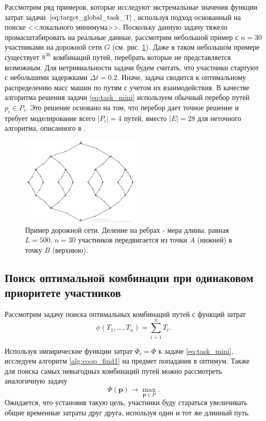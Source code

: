 \documentclass[12pt, a4paper]{article}
\begin{document}
Рассмотрим ряд примеров, которые исследуют экстремальные значения функции затрат задачи $\eqref{eq:target_global_task_T}$, используя подход основанный на поиске <<локального минимума>>. Поскольку данную задачу тяжело промасштабировать на реальные данные, рассмотрим небольшой пример с $n = 30$ участниками на дорожной сети $G$ (см. рис. \ref{ris:graph_average}). Даже в таком небольшом примере существует $8^{30}$ комбинаций путей, перебрать которые не представляется возможным.  Для нетривиальности задачи будем считать, что участники стартуют с небольшими задержками $\Delta t = 0.2$. Иначе, задача сводится к оптимальному распределению масс машин по путям с учетом их взаимодействия. В качестве алгоритма решения задачи \eqref{eq:task_mini} используем обычный перебор путей $p_i \in P_i$. Это решение основано на том, что перебор дает точное решение и требует моделирование всего $|P_i| = 4$ путей, вместо $|E| = 28$ для неточного алгоритма, описанного в \cite{Luba}. 
\begin{figure}[H]
	\begin{center}
		\includegraphics[width = .5\linewidth, height=120pt]{imgs/graph_simple.jpg}
		\caption{Пример дорожной сети. Деление на ребрах - мера длины, равная $L = 500$. $n = 30$ участников передвигается из точки $A$ (нижней) в точку $B$ (верхнюю). }
		\label{ris:graph_average}
	\end{center}
\end{figure}

\subsection{Поиск оптимальной комбинации при одинаковом приоритете участников}

Рассмотрим задачу поиска оптимальных комбинаций путей с функций затрат 
\begin{equation*}
	\phi(T_1, \ldots, T_n) = \sum\limits_{i = 1}^nT_i.
\end{equation*}


Используя эмпирические функции затрат $\overline{\Phi}_i = \Phi$ к задаче \eqref{eq:task_mini}, исследуем алгоритм \ref{alg:coop_find1} на предмет попадания в оптимум. Также для поиска самых невыгодных комбинаций путей можно рассмотреть аналогичную задачу 
\begin{equation}
\label{eq:target_global_task_T_reverse}
\Phi (\textbf{p}) \rightarrow \max \limits_{\textbf{p} \in P}.
\end{equation}
Ожидается, что установив такую цель, участники буду стараться увеличивать общие временные затраты друг друга, используя один и тот же длинный путь. 
\end{document}
